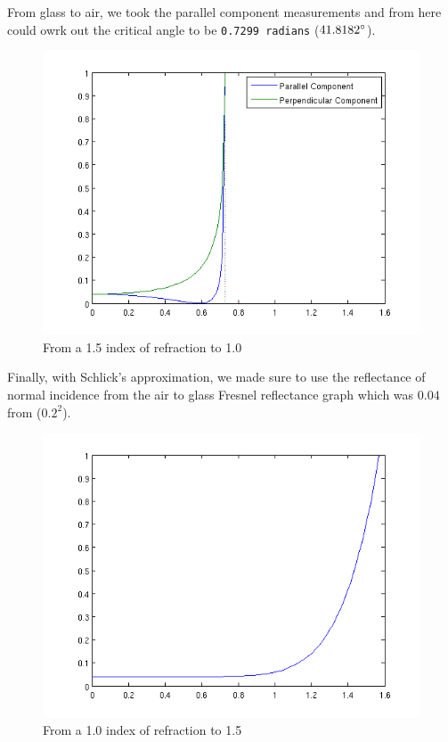 \documentclass{article}
\begin{document}
From glass to air, we took the parallel component measurements and from here
could owrk out the critical angle to be \texttt{0.7299 radians} 
($41.8182\degree$).

\begin{figure}[h]
	\centering
	\includegraphics[scale=0.5]{pics/part1/glass2air.png}
	\caption{From a 1.5 index of refraction to 1.0}
\end{figure}

\newpage

Finally, with Schlick's approximation, we made sure to use the reflectance
of normal incidence from the air to glass Fresnel reflectance graph which 
was $0.04$ from ($0.2^{2}$).

\begin{figure}[h]
	\centering	
	\includegraphics[scale=0.5]{pics/part1/Schlick.png}
	\caption{From a 1.0 index of refraction to 1.5}
\end{figure}
\end{document}
